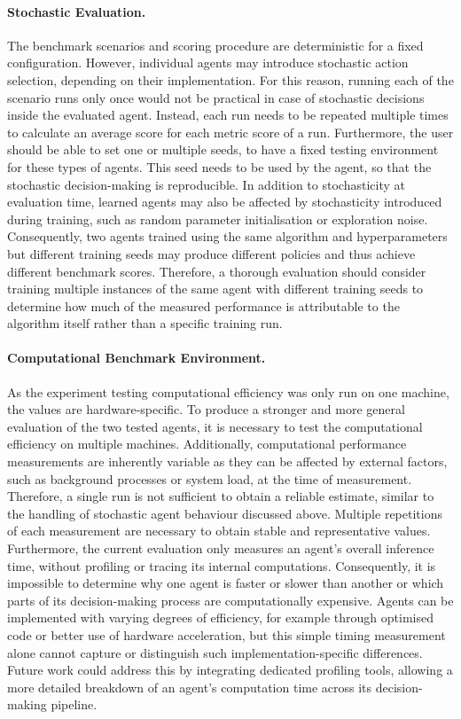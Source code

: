\paragraph{Stochastic Evaluation.}
The benchmark scenarios and scoring procedure are deterministic for a fixed configuration. However, individual agents may introduce stochastic action selection, depending on their implementation. For this reason, running each of the scenario runs only once would not be practical in case of stochastic decisions inside the evaluated agent. Instead, each run needs to be repeated multiple times to calculate an average score for each metric score of a run. Furthermore, the user should be able to set one or multiple seeds, to have a fixed testing environment for these types of agents. This seed needs to be used by the agent, so that the stochastic decision-making is reproducible. In addition to stochasticity at evaluation time, learned agents may also be affected by stochasticity introduced during training, such as random parameter initialisation or exploration noise. Consequently, two agents trained using the same algorithm and hyperparameters but different training seeds may produce different policies and thus achieve different benchmark scores. Therefore, a thorough evaluation should consider training multiple instances of the same agent with different training seeds to determine how much of the measured performance is attributable to the algorithm itself rather than a specific training run.

\paragraph{Computational Benchmark Environment.}
As the experiment testing computational efficiency was only run on one machine, the values are hardware-specific. To produce a stronger and more general evaluation of the two tested agents, it is necessary to test the computational efficiency on multiple machines. Additionally, computational performance measurements are inherently variable as they can be affected by external factors, such as background processes or system load, at the time of measurement. Therefore, a single run is not sufficient to obtain a reliable estimate, similar to the handling of stochastic agent behaviour discussed above. Multiple repetitions of each measurement are necessary to obtain stable and representative values. Furthermore, the current evaluation only measures an agent's overall inference time, without profiling or tracing its internal computations. Consequently, it is impossible to determine why one agent is faster or slower than another or which parts of its decision-making process are computationally expensive. Agents can be implemented with varying degrees of efficiency, for example through optimised code or better use of hardware acceleration, but this simple timing measurement alone cannot capture or distinguish such implementation-specific differences. Future work could address this by integrating dedicated profiling tools, allowing a more detailed breakdown of an agent's computation time across its decision-making pipeline.